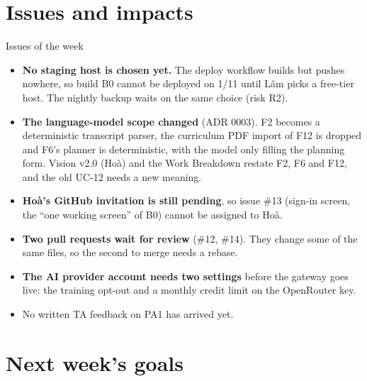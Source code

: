 \documentclass{article}
\begin{document}
\section{Issues and impacts}
\begin{ocnote}{Issues of the week}
\begin{itemize}
  \item \textbf{No staging host is chosen yet.} The deploy workflow builds but pushes nowhere, so build B0 cannot be
        deployed on 1/11 until Lâm picks a free-tier host. The nightly backup waits on the same choice (risk R2).
  \item \textbf{The language-model scope changed} (ADR 0003). F2 becomes a deterministic transcript parser, the curriculum
        PDF import of F12 is dropped and F6's planner is deterministic, with the model only filling the planning form.
        Vision v2.0 (Hoà) and the Work Breakdown restate F2, F6 and F12, and the old UC-12 needs a new meaning.
  \item \textbf{Hoà's GitHub invitation is still pending}, so issue \#13 (sign-in screen, the ``one working screen'' of
        B0) cannot be assigned to Hoà.
  \item \textbf{Two pull requests wait for review} (\#12, \#14). They change some of the same files, so the second to
        merge needs a rebase.
  \item \textbf{The AI provider account needs two settings} before the gateway goes live: the training opt-out and a
        monthly credit limit on the OpenRouter key.
  \item No written TA feedback on PA1 has arrived yet.
\end{itemize}
\end{ocnote}

\section{Next week's goals}
\end{document}
